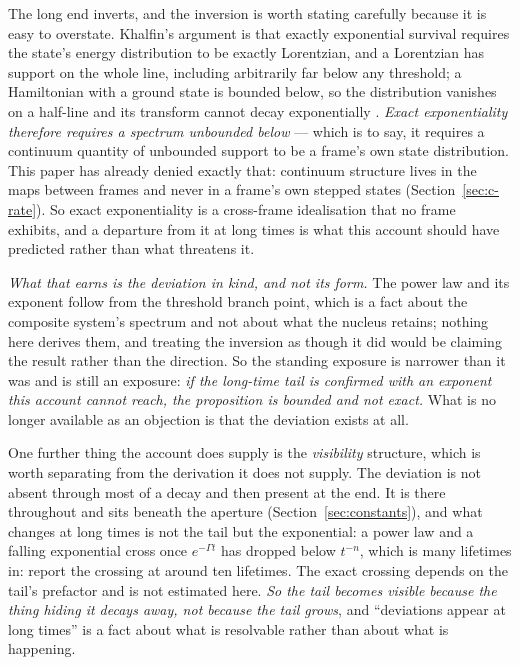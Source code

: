 \documentclass[11pt,a4paper]{article}
\theoremstyle{remark}\newtheorem{remark}[definition]{Remark}
\begin{document}
The long end inverts, and the inversion is worth stating carefully because it is easy to overstate.
Khalfin's argument is that exactly exponential survival requires the state's energy distribution to
be exactly Lorentzian, and a Lorentzian has support on the whole line, including arbitrarily far
below any threshold; a Hamiltonian with a ground state is bounded below, so the distribution vanishes
on a half-line and its transform cannot decay exponentially \citep{khalfin1957}. \emph{Exact
exponentiality therefore requires a spectrum unbounded below} --- which is to say, it requires a
continuum quantity of unbounded support to be a frame's own state distribution. This paper has
already denied exactly that: continuum structure lives in the maps between frames and never in a
frame's own stepped states (Section~\ref{sec:c-rate}). So exact exponentiality is a cross-frame
idealisation that no frame exhibits, and a departure from it at long times is what this account
should have predicted rather than what threatens it.

\emph{What that earns is the deviation in kind, and not its form.} The power law and its exponent
follow from the threshold branch point, which is a fact about the composite system's spectrum and not
about what the nucleus retains; nothing here derives them, and treating the inversion as though it
did would be claiming the result rather than the direction. So the standing exposure is narrower than
it was and is still an exposure: \emph{if the long-time tail is confirmed with an exponent this
account cannot reach, the proposition is bounded and not exact.} What is no longer available as an
objection is that the deviation exists at all.

One further thing the account does supply is the \emph{visibility} structure, which is worth
separating from the derivation it does not supply. The deviation is not absent through most of a
decay and then present at the end. It is there throughout and sits beneath the aperture
(Section~\ref{sec:constants}), and what changes at long times is not the tail but the exponential: a
power law and a falling exponential cross once $e^{-\Gamma t}$ has dropped below $t^{-n}$, which is
many lifetimes in: \citet{rothe2006} report the crossing at around ten lifetimes. The
exact crossing depends on the tail's prefactor and is not estimated here. \emph{So the tail becomes
visible because the thing hiding it decays away, not because the tail grows}, and ``deviations appear
at long times'' is a fact about what is resolvable rather than about what is happening.
\end{document}
